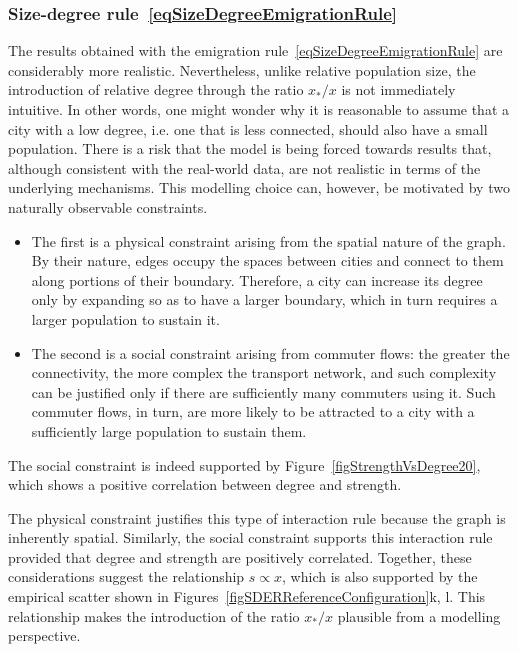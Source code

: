 \documentclass[a4paper]{article}
\begin{document}
\subsubsection{Size-degree rule~\texorpdfstring{\eqref{eqSizeDegreeEmigrationRule}}{}}
The results obtained with the emigration rule~\eqref{eqSizeDegreeEmigrationRule} are considerably more realistic. Nevertheless, unlike relative population size, the introduction of relative degree through the ratio $x_\ast/x$ is not immediately intuitive. In other words, one might wonder why it is reasonable to assume that a city with a low degree, i.e. one that is less connected, should also have a small population. There is a risk that the model is being forced towards results that, although consistent with the real-world data, are not realistic in terms of the underlying mechanisms. This modelling choice can, however, be motivated by two naturally observable constraints.
\begin{itemize}
\item The first is a physical constraint arising from the spatial nature of the graph. By their nature, edges occupy the spaces between cities and connect to them along portions of their boundary. Therefore, a city can increase its degree only by expanding so as to have a larger boundary, which in turn requires a larger population to sustain it.
\item The second is a social constraint arising from commuter flows: the greater the connectivity, the more complex the transport network, and such complexity can be justified only if there are sufficiently many commuters using it. Such commuter flows, in turn, are more likely to be attracted to a city with a sufficiently large population to sustain them.
\end{itemize}

The social constraint is indeed supported by Figure~\ref{figStrengthVsDegree20}, which shows a positive correlation between degree and strength.
                
The physical constraint justifies this type of interaction rule because the graph is inherently spatial. Similarly, the social constraint supports this interaction rule provided that degree and strength are positively correlated. Together, these considerations suggest the relationship $s\propto x$, which is also supported by the empirical scatter shown in Figures~\ref{figSDERReferenceConfiguration}k, l. This relationship makes the introduction of the ratio $x_\ast/x$ plausible from a modelling perspective.
\end{document}
